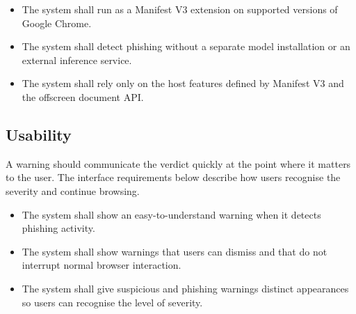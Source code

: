 \documentclass{FastFyp}
\begin{document}
\begin{itemize}
    \item The system shall run as a Manifest V3 extension on supported versions of Google Chrome.
    \item The system shall detect phishing without a separate model installation or an external inference service.
    \item The system shall rely only on the host features defined by Manifest V3 and the offscreen document API.
\end{itemize}

\subsection{Usability}
A warning should communicate the verdict quickly at the point where it matters to the user. The interface requirements below describe how users recognise the severity and continue browsing.

\begin{itemize}
    \item The system shall show an easy-to-understand warning when it detects phishing activity.
    \item The system shall show warnings that users can dismiss and that do not interrupt normal browser interaction.
    \item The system shall give suspicious and phishing warnings distinct appearances so users can recognise the level of severity.
\end{itemize}
\end{document}
